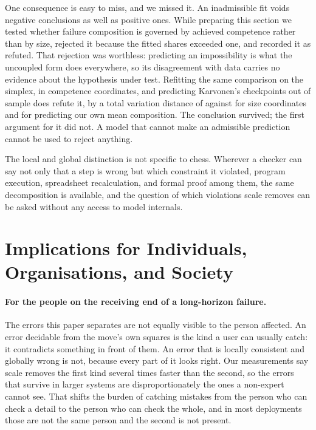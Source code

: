 \documentclass[11pt]{article}
\begin{document}
One consequence is easy to miss, and we missed it. An inadmissible fit voids
negative conclusions as well as positive ones. While preparing this section we
tested whether failure composition is governed by achieved competence rather than
by size, rejected it because the fitted shares exceeded one, and recorded it as
refuted. That rejection was worthless: predicting an impossibility is what the
uncoupled form does everywhere, so its disagreement with data carries no evidence
about the hypothesis under test. Refitting the same comparison on the simplex, in
competence coordinates, and predicting Karvonen's checkpoints out of sample does
refute it, by a total variation distance of  against
 for size coordinates and  for predicting our
own mean composition. The conclusion survived; the first argument for it did not.
A model that cannot make an admissible prediction cannot be used to reject
anything.

The local and global distinction is not specific to chess. Wherever a checker can
say not only that a step is wrong but which constraint it violated, program
execution, spreadsheet recalculation, and formal proof among them, the same
decomposition is available, and the question of which violations scale removes can
be asked without any access to model internals.

\section{Implications for Individuals, Organisations, and Society}
\label{sec:implications}

\paragraph{For the people on the receiving end of a long-horizon failure.}
The errors this paper separates are not equally visible to the person affected. An
error decidable from the move's own squares is the kind a user can usually catch:
it contradicts something in front of them. An error that is locally consistent and
globally wrong is not, because every part of it looks right. Our measurements say
scale removes the first kind several times faster than the second, so the errors
that survive in larger systems are disproportionately the ones a non-expert cannot
see. That shifts the burden of catching mistakes from the person who can check a
detail to the person who can check the whole, and in most deployments those are not
the same person and the second is not present.
\end{document}
